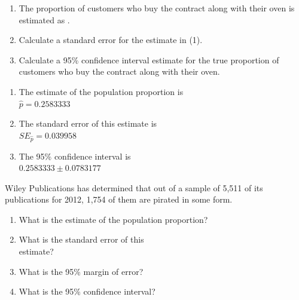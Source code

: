 \documentclass[11pt, chapterprefix=true]{scrbook}\usepackage[]{graphicx}\usepackage[]{color}
\begin{document}
\begin{exercises}
\begin{exercise}
\begin{enumerate}
\item	The proportion of customers who buy the contract along with their oven is estimated as \underline{\phantom{xxxxxxxxxx}}.
\item	Calculate a standard error for the estimate in (1).
\item	Calculate a 95\% confidence interval estimate for the true proportion of customers who buy the contract along with their oven.
\end{enumerate}
\end{exercise}
\begin{solution} %


\begin{enumerate}
\item	The estimate of the population proportion is \\ $\hat{p} = 0.2583333$
\item	The standard error of this estimate is \\ $SE_{\hat{p}} = 0.039958$
\item	The 95\% confidence interval is \\ $0.2583333 \pm 0.0783177$
\end{enumerate}
\end{solution}

\begin{exercise} %

Wiley Publications has determined that out of a sample of 5,511 of its publications for 2012, 1,754 of them are pirated in some form.

\begin{enumerate}
\item	What is the estimate of the population proportion?
\item	What is the standard error of this \\ estimate?
\item	What is the 95\% margin of error?
\item	What is the 95\% confidence interval?
\end{enumerate}
\end{exercise}
%


\end{exercises}
\end{document}
